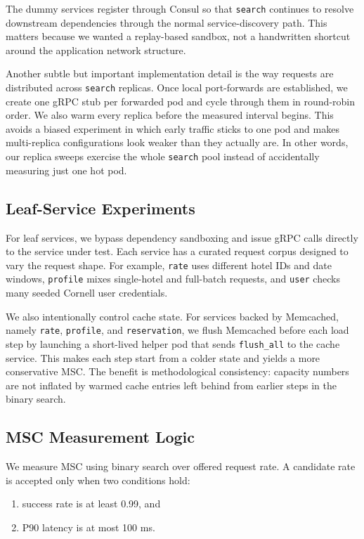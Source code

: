\documentclass[conference]{IEEEtran}
\begin{document}
The dummy services register through Consul so that \texttt{search} continues to resolve downstream dependencies through the normal service-discovery path. This matters because we wanted a replay-based sandbox, not a handwritten shortcut around the application network structure.

Another subtle but important implementation detail is the way requests are distributed across \texttt{search} replicas. Once local port-forwards are established, we create one gRPC stub per forwarded pod and cycle through them in round-robin order. We also warm every replica before the measured interval begins. This avoids a biased experiment in which early traffic sticks to one pod and makes multi-replica configurations look weaker than they actually are. In other words, our replica sweeps exercise the whole \texttt{search} pool instead of accidentally measuring just one hot pod.

\subsection{Leaf-Service Experiments}
For leaf services, we bypass dependency sandboxing and issue gRPC calls directly to the service under test. Each service has a curated request corpus designed to vary the request shape. For example, \texttt{rate} uses different hotel IDs and date windows, \texttt{profile} mixes single-hotel and full-batch requests, and \texttt{user} checks many seeded Cornell user credentials.

We also intentionally control cache state. For services backed by Memcached, namely \texttt{rate}, \texttt{profile}, and \texttt{reservation}, we flush Memcached before each load step by launching a short-lived helper pod that sends \texttt{flush\_all} to the cache service. This makes each step start from a colder state and yields a more conservative MSC. The benefit is methodological consistency: capacity numbers are not inflated by warmed cache entries left behind from earlier steps in the binary search.

\subsection{MSC Measurement Logic}
We measure MSC using binary search over offered request rate. A candidate rate is accepted only when two conditions hold:
\begin{enumerate}
\item success rate is at least 0.99, and
\item P90 latency is at most 100 ms.
\end{enumerate}
\end{document}

